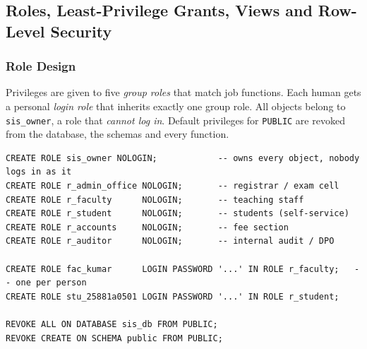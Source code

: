 \documentclass[11pt,a4paper]{report}
\begin{document}
\subsection{Roles, Least-Privilege Grants, Views and Row-Level Security}
\label{sec:rbac}
\subsubsection{Role Design}
Privileges are given to five \emph{group roles} that match job functions. Each human gets a personal \emph{login role} that inherits exactly one group role. All objects belong to \texttt{sis\_owner}, a role that \emph{cannot log in}. Default privileges for \texttt{PUBLIC} are revoked from the database, the schemas and every function.

\begin{lstlisting}[caption={Role hierarchy (from \texttt{01\_roles.sql})}]
CREATE ROLE sis_owner NOLOGIN;            -- owns every object, nobody logs in as it
CREATE ROLE r_admin_office NOLOGIN;       -- registrar / exam cell
CREATE ROLE r_faculty      NOLOGIN;       -- teaching staff
CREATE ROLE r_student      NOLOGIN;       -- students (self-service)
CREATE ROLE r_accounts     NOLOGIN;       -- fee section
CREATE ROLE r_auditor      NOLOGIN;       -- internal audit / DPO

CREATE ROLE fac_kumar      LOGIN PASSWORD '...' IN ROLE r_faculty;   -- one per person
CREATE ROLE stu_25881a0501 LOGIN PASSWORD '...' IN ROLE r_student;

REVOKE ALL ON DATABASE sis_db FROM PUBLIC;
REVOKE CREATE ON SCHEMA public FROM PUBLIC;
\end{lstlisting}
\end{document}
